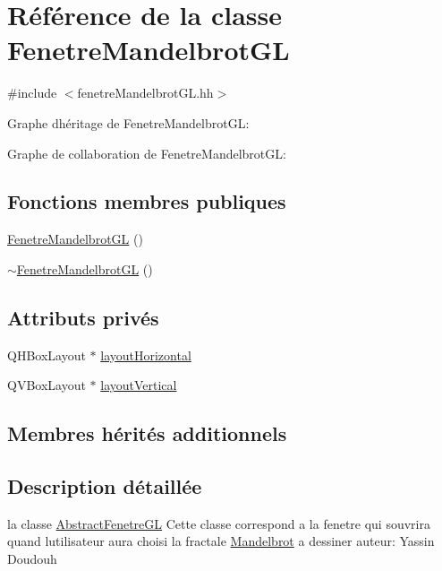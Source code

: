 \hypertarget{classFenetreMandelbrotGL}{}\section{Référence de la classe Fenetre\+Mandelbrot\+GL}
\label{classFenetreMandelbrotGL}


{\ttfamily \#include $<$fenetre\+Mandelbrot\+G\+L.\+hh$>$}



Graphe d\textquotesingle{}héritage de Fenetre\+Mandelbrot\+GL\+:


Graphe de collaboration de Fenetre\+Mandelbrot\+GL\+:
\subsection*{Fonctions membres publiques}
\begin{DoxyCompactItemize}
\item 
\hyperlink{classFenetreMandelbrotGL_a901a2573d41d44af6123106496e26d87}{Fenetre\+Mandelbrot\+GL} ()
\item 
\hyperlink{classFenetreMandelbrotGL_ab08cf13fb9566af3e920531de128bf26}{$\sim$\+Fenetre\+Mandelbrot\+GL} ()
\end{DoxyCompactItemize}
\subsection*{Attributs privés}
\begin{DoxyCompactItemize}
\item 
Q\+H\+Box\+Layout $\ast$ \hyperlink{classFenetreMandelbrotGL_ad775768630cb988b45d47a1deefbdce2}{layout\+Horizontal}
\item 
Q\+V\+Box\+Layout $\ast$ \hyperlink{classFenetreMandelbrotGL_aa5fbba88a7419f44316213673c6ef138}{layout\+Vertical}
\end{DoxyCompactItemize}
\subsection*{Membres hérités additionnels}


\subsection{Description détaillée}
la classe \hyperlink{classAbstractFenetreGL}{Abstract\+Fenetre\+GL} Cette classe correspond a la fenetre qui s\textquotesingle{}ouvrira quand l\textquotesingle{}utilisateur aura choisi la fractale \hyperlink{classMandelbrot}{Mandelbrot} a dessiner auteur\+: Yassin Doudouh 

